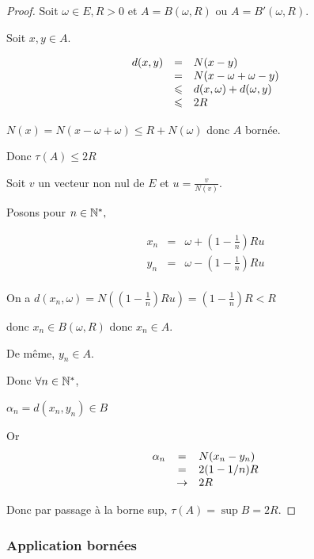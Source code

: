 \begin{proof}
    Soit $\omega \in E, R>0$ et $A = B(\omega, R)$ ou $A = B'(\omega, R)$. 

    Soit $x, y \in A$. 

    \[
    \begin{array}{rcl}
        d(x, y) & = & N(x - y) \\
        \space & = & N(x - \omega + \omega - y) \\
        \space & \leqslant & d(x, \omega) + d(\omega, y) \\
        \space & \leqslant & 2R \\
    \end{array}
    \]

    $N(x) = N(x - \omega + \omega) \leqslant R + N(\omega)$ donc $A$ bornée. 

    Donc $\tau(A) \leqslant 2R$

    Soit $v$ un vecteur non nul de $E$ et $u = \frac v {N(v)}$. 

    Posons pour $n \in \mathbb{N}^*,$

    \[
    \begin{array}{rcl}
        x_n & = & \omega + (1 - \frac 1 n) R u \\
        y_n & = & \omega - ( 1 - \frac 1 n) R u \\
    \end{array}
    \]

    On a $d(x_n, \omega) = N((1 - \frac 1 n)Ru) = ( 1 - \frac 1 n )R < R$

    donc $x_n \in B(\omega, R)$ donc $x_n \in A$. 

    De même, $y_n \in A$.

    Donc $\forall n \in \mathbb{N}^*$, 

    $\alpha_n = d(x_n, y_n) \in B$

    Or 
    \[
    \begin{array}{rcl}
        \alpha_n & = & N(x_n - y_n) \\
        \space & = & 2 (1 - 1 / n) R \\
        \space & \to & 2 R \\
    \end{array}
    \]

    Donc par passage à la borne sup, $\tau(A) = \sup B = 2R$.    
\end{proof}

\subsubsection{Application bornées}

